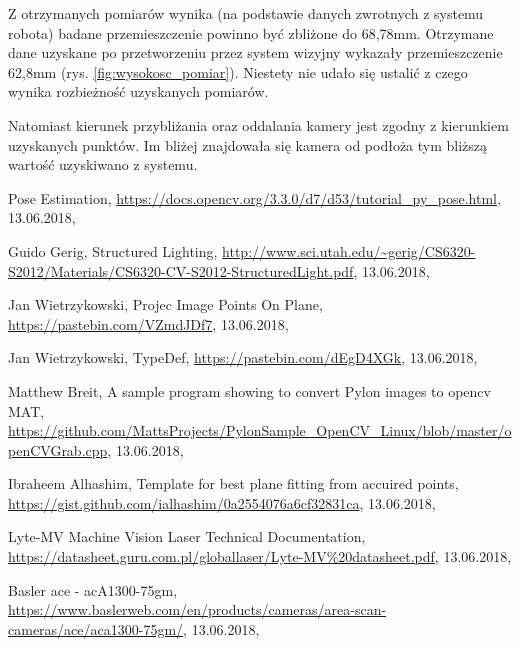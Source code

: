 \documentclass[conference]{IEEEtran}
\begin{document}
Z otrzymanych pomiarów wynika (na podstawie danych zwrotnych z systemu robota) badane przemieszczenie powinno być zbliżone do 68,78mm. Otrzymane dane uzyskane po przetworzeniu przez system wizyjny wykazały przemieszczenie 62,8mm (rys. \ref{fig:wysokosc_pomiar}). Niestety nie udało się ustalić z czego wynika rozbieżność uzyskanych pomiarów.

Natomiast kierunek przybliżania oraz oddalania kamery jest zgodny z kierunkiem uzyskanych punktów. Im bliżej znajdowała się kamera od podłoża tym bliższą wartość uzyskiwano z systemu.

\newpage

\begin{thebibliography}{00}
Pose Estimation, \url{https://docs.opencv.org/3.3.0/d7/d53/tutorial_py_pose.html}, 13.06.2018,

Guido Gerig,
Structured Lighting, 
\url{http://www.sci.utah.edu/~gerig/CS6320-S2012/Materials/CS6320-CV-S2012-StructuredLight.pdf}, 13.06.2018,

Jan Wietrzykowski,
Projec Image Points On Plane, 
\url{https://pastebin.com/VZmdJDf7}, 13.06.2018,

Jan Wietrzykowski,
TypeDef, 
\url{https://pastebin.com/dEgD4XGk}, 13.06.2018,

Matthew Breit,
A sample program showing to convert Pylon images to opencv MAT, 
\url{https://github.com/MattsProjects/PylonSample_OpenCV_Linux/blob/master/openCVGrab.cpp}, 13.06.2018,

Ibraheem Alhashim,
Template for best plane fitting from accuired points, 
\url{https://gist.github.com/ialhashim/0a2554076a6cf32831ca}, 13.06.2018,

Lyte-MV Machine Vision Laser Technical Documentation, 
\url{https://datasheet.guru.com.pl/globallaser/Lyte-MV\%20datasheet.pdf}, 13.06.2018,

Basler ace - acA1300-75gm, 
\url{https://www.baslerweb.com/en/products/cameras/area-scan-cameras/ace/aca1300-75gm/}, 13.06.2018,

\end{thebibliography}
\end{document}
